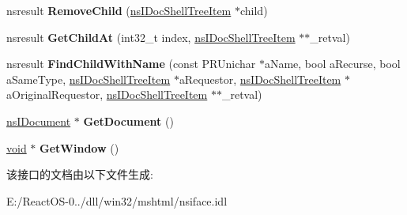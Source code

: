 \begin{DoxyCompactItemize}
\item 
\mbox{\label{interfacens_i_doc_shell_tree_item_a5d87b25857f5b81a1e284e5690bf75ce}} 
nsresult {\bfseries Remove\+Child} (\hyperlink{interfacens_i_doc_shell_tree_item}{ns\+I\+Doc\+Shell\+Tree\+Item} $\ast$child)
\item 
\mbox{\label{interfacens_i_doc_shell_tree_item_afbfd9af4af94b638b7b96ed35cd10a8a}} 
nsresult {\bfseries Get\+Child\+At} (int32\+\_\+t index, \hyperlink{interfacens_i_doc_shell_tree_item}{ns\+I\+Doc\+Shell\+Tree\+Item} $\ast$$\ast$\+\_\+retval)
\item 
\mbox{\label{interfacens_i_doc_shell_tree_item_acb9ea86aba9d5a0a4052ad92a7164baa}} 
nsresult {\bfseries Find\+Child\+With\+Name} (const P\+R\+Unichar $\ast$a\+Name, bool a\+Recurse, bool a\+Same\+Type, \hyperlink{interfacens_i_doc_shell_tree_item}{ns\+I\+Doc\+Shell\+Tree\+Item} $\ast$a\+Requestor, \hyperlink{interfacens_i_doc_shell_tree_item}{ns\+I\+Doc\+Shell\+Tree\+Item} $\ast$a\+Original\+Requestor, \hyperlink{interfacens_i_doc_shell_tree_item}{ns\+I\+Doc\+Shell\+Tree\+Item} $\ast$$\ast$\+\_\+retval)
\item 
\mbox{\label{interfacens_i_doc_shell_tree_item_afedd09097f167a117f8a9e17145a2c7e}} 
\hyperlink{interfacens_i_document}{ns\+I\+Document} $\ast$ {\bfseries Get\+Document} ()
\item 
\mbox{\label{interfacens_i_doc_shell_tree_item_a2652b24cd6dd39b4d1d4d6b3c6a194d5}} 
\hyperlink{interfacevoid}{void} $\ast$ {\bfseries Get\+Window} ()
\end{DoxyCompactItemize}


该接口的文档由以下文件生成\+:\begin{DoxyCompactItemize}
\item 
E\+:/\+React\+O\+S-\/0../dll/win32/mshtml/nsiface.\+idl\end{DoxyCompactItemize}
